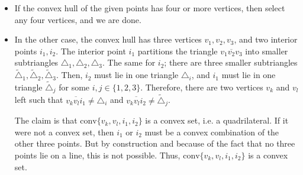 \documentclass[fontsize=11pt, paper=a4]{scrartcl}
\begin{document}

\begin{itemize}
    \item If the convex hull of the given points has four or more vertices, then select any four vertices, and we are done.
    \begin{center}
    \end{center}
    

    \item In the other case, the convex hull has three vertices $v_1,v_2,v_3$, and two interior points $i_1,i_2$. The interior point $i_1$ partitions the triangle $\overline{v_1v_2v_3}$ into smaller subtriangles $\triangle_1, \triangle_2, \triangle_3$. The same for $i_2$; there are three smaller subtriangles $\tilde \triangle_1, \tilde \triangle_2, \tilde \triangle_3$. Then, $i_2$ must lie in one triangle $\triangle_i$, and $i_1$ must lie in one triangle $\tilde \triangle_j$ for some $i,j \in \{1,2,3\}$. Therefore, there are two vertices $v_k$ and $v_l$ left such that $\overline{v_kv_li_1} \neq \triangle_{i}$ and $\overline{v_kv_li_2} \neq \tilde \triangle_j$.
    
    The claim is that $\mathrm{conv}\{v_k, v_l, i_1, i_2\}$ is a convex set, i.e. a quadrilateral. If it were not a convex set, then $i_1$ or $i_2$ must be a convex combination of the other three points. But by construction and because of the fact that no three points lie on a line, this is not possible. Thus, $\mathrm{conv}\{v_k, v_l, i_1, i_2\}$ is a convex set.
        
    \begin{center}
\end{center}
\end{itemize}
\end{document}
